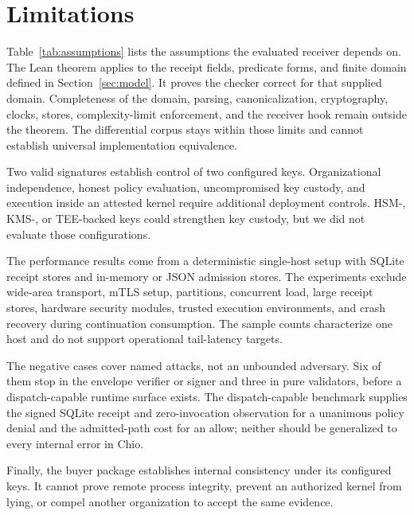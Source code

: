 \section{Limitations}
\label{sec:limits}

Table~\ref{tab:assumptions} lists the assumptions the evaluated receiver
depends on. The Lean theorem applies to the receipt fields, predicate forms,
and finite domain defined in Section~\ref{sec:model}. It proves the checker
correct for that supplied domain. Completeness of the domain, parsing,
canonicalization, cryptography, clocks, stores, complexity-limit enforcement,
and the receiver hook remain outside the theorem. The differential corpus
stays within those limits and cannot establish universal implementation
equivalence.

Two valid signatures establish control of two configured keys. Organizational
independence, honest policy evaluation, uncompromised key custody, and execution
inside an attested kernel require additional deployment controls. HSM-, KMS-,
or TEE-backed keys could strengthen key custody, but we did not evaluate those
configurations.

The performance results come from a deterministic single-host setup with
SQLite receipt stores and in-memory or JSON admission stores. The experiments
exclude wide-area transport, mTLS setup, partitions, concurrent load, large
receipt stores, hardware security modules, trusted execution environments, and
crash recovery during continuation consumption. The sample counts characterize
one host and do not support operational tail-latency targets.

The \PSThreatCaseCount{} negative cases cover named attacks, not an unbounded
adversary. Six of them stop in the envelope verifier or signer and three in
pure validators, before a dispatch-capable runtime surface exists. The
dispatch-capable benchmark supplies the signed SQLite receipt and
zero-invocation observation for a unanimous policy denial and the admitted-path
cost for an allow; neither should be generalized to every internal error in
Chio.

Finally, the buyer package establishes internal consistency under its
configured keys. It cannot prove remote process integrity, prevent an
authorized kernel from lying, or compel another organization to accept the
same evidence.
